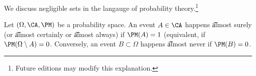 

We discuss negligible sets in the langauge of probability theory.\footnote{Future editions may modify this explanation.}


Let $(\Omega, \CA, \PM)$ be a probability space.
An event $A \in \CA$ happens \t{almost surely} (or \t{almost certainly} or \t{almost always}) if $\PM(A) = 1$ (equivalent, if $\PM(\Omega \setminus A) = 0$.
Conversely, an event $B \subset \Omega$ happens \t{almost never} if $\PM(B) = 0$.

\blankpage
